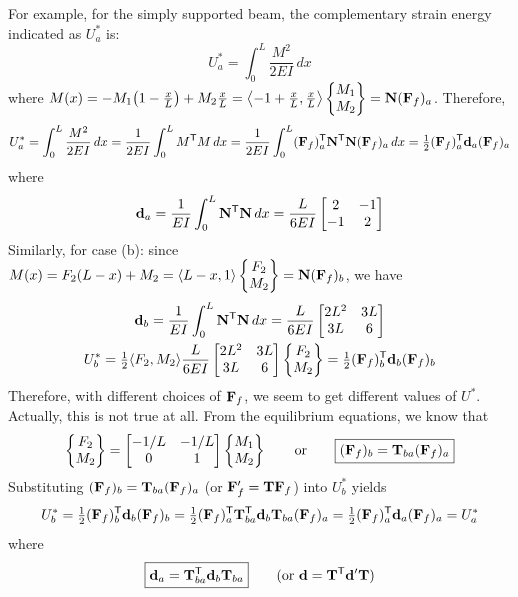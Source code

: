 For example, for the simply supported beam, the complementary strain energy indicated as $U^*_a$ is:
\begin{equation*}
  U^*_a = \int_0^L\frac{M^2}{2EI}\,dx
\end{equation*}
where $M(x) = -M_1\bigl(1-\frac xL\bigr) + M_2\frac xL = \bigl\langle -1+\frac xL, \frac xL\bigr\rangle\begin{Bmatrix}M_1\\ M_2\end{Bmatrix} = \mathbf{N}(\mathbf{F}_f)_a$. Therefore,
\begin{equation*}
  U^*_a = \int_0^L\frac{M^2}{2EI}\,dx = \frac{1}{2EI}\int_0^L M^{\mathsf{T}} M\,dx = \frac{1}{2EI}\int_0^L(\mathbf{F}_f)_a^{\mathsf{T}}\mathbf{N}^{\mathsf{T}}\mathbf{N}(\mathbf{F}_f)_a\,dx = \tfrac12(\mathbf{F}_f)_a^{\mathsf{T}}\mathbf{d}_a(\mathbf{F}_f)_a
\end{equation*}
where
\begin{equation*}
  \mathbf{d}_a = \frac{1}{EI}\int_0^L\mathbf{N}^{\mathsf{T}}\mathbf{N}\,dx = \frac{L}{6EI}\begin{bmatrix}2 & -1\\ -1 & 2\end{bmatrix}
\end{equation*}
Similarly, for case (b): since $M(x) = F_2(L-x) + M_2 = \langle L-x, 1\rangle\begin{Bmatrix}F_2\\ M_2\end{Bmatrix} = \mathbf{N}(\mathbf{F}_f)_b$, we have
\begin{gather*}
  \mathbf{d}_b = \frac{1}{EI}\int_0^L\mathbf{N}^{\mathsf{T}}\mathbf{N}\,dx = \frac{L}{6EI}\begin{bmatrix}2L^2 & 3L\\ 3L & 6\end{bmatrix}\\
  U^*_b = \tfrac12\langle F_2, M_2\rangle\frac{L}{6EI}\begin{bmatrix}2L^2 & 3L\\ 3L & 6\end{bmatrix}\begin{Bmatrix}F_2\\ M_2\end{Bmatrix} = \tfrac12(\mathbf{F}_f)_b^{\mathsf{T}}\mathbf{d}_b(\mathbf{F}_f)_b
\end{gather*}
Therefore, with different choices of $\mathbf{F}_f$, we seem to get different values of $U^*$. Actually, this is not true at all. From the equilibrium equations, we know that
\begin{equation*}
  \begin{Bmatrix}F_2\\ M_2\end{Bmatrix} = \begin{bmatrix}-1/L & -1/L\\ 0 & 1\end{bmatrix}\begin{Bmatrix}M_1\\ M_2\end{Bmatrix}\qquad\text{or}\qquad\boxed{(\mathbf{F}_f)_b = \mathbf{T}_{ba}(\mathbf{F}_f)_a}
\end{equation*}
Substituting $(\mathbf{F}_f)_b = \mathbf{T}_{ba}(\mathbf{F}_f)_a$ (or $\mathbf{F}_f' = \mathbf{T}\mathbf{F}_f$) into $U^*_b$ yields
\begin{equation*}
  U^*_b = \tfrac12(\mathbf{F}_f)_b^{\mathsf{T}}\mathbf{d}_b(\mathbf{F}_f)_b = \tfrac12(\mathbf{F}_f)_a^{\mathsf{T}}\mathbf{T}_{ba}^{\mathsf{T}}\mathbf{d}_b\mathbf{T}_{ba}(\mathbf{F}_f)_a = \tfrac12(\mathbf{F}_f)_a^{\mathsf{T}}\mathbf{d}_a(\mathbf{F}_f)_a = U^*_a
\end{equation*}
where
\begin{equation*}
  \boxed{\mathbf{d}_a = \mathbf{T}_{ba}^{\mathsf{T}}\mathbf{d}_b\mathbf{T}_{ba}}\qquad(\text{or } \mathbf{d} = \mathbf{T}^{\mathsf{T}}\mathbf{d}'\mathbf{T})
\end{equation*}
